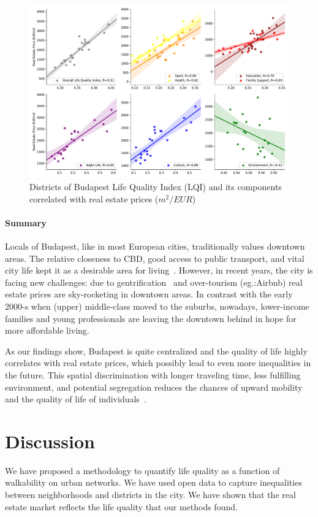 \begin{figure}[htbp]
	\centering
	\includegraphics[width=\textwidth]{images/lqi/LQI_categories_regplots.pdf}
	\caption[Budapest life quality index correlation with real estate prices]{Districts of Budapest Life Quality Index (LQI) and its components correlated with real estate prices ($m^{2}/EUR$)}
	\label{fig:LQI_ev}
\end{figure}

\paragraph{Summary} Locals of Budapest, like in most European cities, traditionally values downtown areas. The relative closeness to CBD, good access to public transport, and vital city life kept it as a desirable area for living~\cite{Cassiers2012Socio}. However, in recent years, the city is facing new challenges: due to gentrification~\cite{Garcia2004Cultural} and over-tourism (eg.:Airbnb) real estate prices are sky-rocketing in downtown areas. In contrast with the early 2000-s when (upper) middle-class moved to the suburbs, nowadays, lower-income families and young professionals are leaving the downtown behind in hope for more affordable living.

As our findings show, Budapest is quite centralized and the quality of life highly correlates with real estate prices, which possibly lead to even more inequalities in the future. This spatial discrimination with longer traveling time, less fulfilling environment, and potential segregation reduces the chances of upward mobility and the quality of life of individuals~\cite{Gobillon2007Mechanisms}.

\section{Discussion}
We have proposed a methodology to quantify life quality as a function of walkability on urban networks. We have used open data to capture inequalities between neighborhoods and districts in the city. We have shown that the real estate market reflects the life quality that our methods found.

